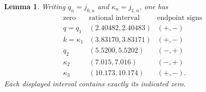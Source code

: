 \documentclass[11pt]{article}
\newtheorem{lemma}[theorem]{Lemma}
\theoremstyle{remark}
\begin{document}
\begin{lemma}

Writing $q_n=j_{0,n}$ and $\kappa_n=j_{1,n}$, one has
\begin{equation}\label{subm:root-boxes}
\begin{array}{c|c|c}
 \text{zero}&\text{rational interval}&\text{endpoint signs}\\\hline
 q=q_1&(2.40482,2.40483)&(+,-)\\
 k=\kappa_1&(3.83170,3.83171)&(+,-)\\
 q_2&(5.5200,5.5202)&(-,+)\\
 \kappa_2&(7.015,7.016)&(-,+)\\
 \kappa_3&(10.173,10.174)&(+,-).
\end{array}
\end{equation}
Each displayed interval contains exactly its indicated zero.
\end{lemma}
\end{document}
